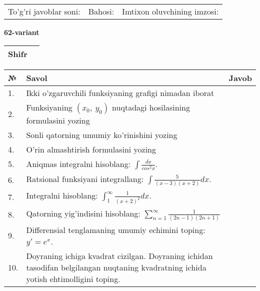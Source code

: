 \documentclass{article}
\begin{document}
  \vspace{1cm}
  
  \begin{tabular}{lll}
  To'g'ri javoblar soni: \underline{\hspace{1.5cm}} & 
  Bahosi: \underline{\hspace{1.5cm}} & 
  Imtixon oluvchining imzosi: \underline{\hspace{2cm}} \\
  \end{tabular}
  
  \egroup
  
  \newpage
  
  
  \textbf{62-variant}\\
  
  \bgroup
  \def\arraystretch{1.6} %
  
  \begin{tabular}{|m{5.7cm}|m{9.5cm}|}
  \hline
  Shifr & \\
  \hline
  \end{tabular}
  
  \vspace{1cm}
  
  \begin{tabular}{|m{0.7cm}|m{10cm}|m{4cm}|}
  \hline
  № & Savol & Javob \\
  \hline
  1. & Ikki o'zgaruvchili funksiyaning grafigi nimadan iborat &  \\
  \hline
  2. & Funksiyaning \((x_{0},\ y_{0})\) nuqtadagi hosilasining formulasini yozing &  \\
  \hline
  3. & Sonli qatorning umumiy ko'rinishini yozing &  \\
  \hline
  4. & O'rin almashtirish formulasini yozing &  \\
  \hline
  5. & Aniqmas integralni hisoblang: \(\int \frac{dx}{cos^{2}x}\). &  \\
  \hline
  6. & Ratsional funksiyani integrallang: \(\int {\frac{5}{(x - 3)(x + 2)}dx}\). &  \\
  \hline
  7. & Integralni hisoblang: \(\int_{1}^{\infty}{\frac{1}{(x + 2)^{2}}dx}\). &  \\
  \hline
  8. & Qatorning yig'indisini hisoblang: \(\sum_{n = 1}^{\infty}\frac{1}{(2n - 1)(2n + 1)}\) &  \\
  \hline
  9. & Differensial tenglamaning umumiy echimini toping: \(y' = e^{x}\). &  \\
  \hline
  10. & Doyraning ichiga kvadrat cizilgan. Doyraning ichidan tasodifan belgilangan nuqtaning kvadratning ichida yotish ehtimolligini toping. &  \\
  \hline
  \end{tabular}
  
\end{document}
